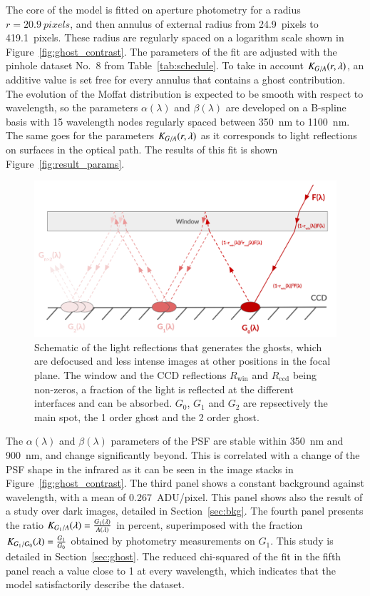 The core of the model is fitted on aperture photometry for a radius $r=\SI{20.9}{pixels}$, and then annulus of external radius from \SI{24.9}{pixels} to \SI{419.1}{pixels}. These radius are regularly spaced on a logarithm scale shown in Figure~\ref{fig:ghost_contrast}. The parameters of the fit are adjusted with the \spinhole pinhole dataset No.~8 from Table~\ref{tab:schedule}. To take in account $K_{G/A}(r, \lambda)$, an additive value is set free for every annulus that contains a ghost contribution. The evolution of the Moffat distribution is expected to be smooth with respect to wavelength, so the parameters $\alpha(\lambda)$ and $\beta(\lambda)$ are developed on a B-spline basis with 15 wavelength nodes regularly spaced between \SI{350}{\nano\meter} to \SI{1100}{\nano\meter}. The same goes for the parameters $K_{G/A}(r, \lambda)$ as it corresponds to light reflections on surfaces in the optical path. The results of this fit is shown Figure~\ref{fig:result_params}. 

\begin{figure}[h]
    \centering
    \includegraphics[width=\columnwidth]{fig/schema_ghost.pdf}
    \caption{Schematic of the light reflections that generates the ghosts, which are defocused and less intense images at other positions in the focal plane. The window and the CCD reflections $R_\mathrm{win}$ and $R_\mathrm{ccd}$ being non-zeros, a fraction of the light is reflected at the different interfaces and can be absorbed. $G_0$, $G_1$ and $G_2$ are repsectively the main spot, the 1 order ghost and the 2 order ghost.}
    \label{fig:schema_ghost}
\end{figure}

The $\alpha(\lambda)$ and $\beta(\lambda)$ parameters of the PSF are stable within \SI{350}{\nano\meter} and \SI{900}{\nano\meter}, and change significantly beyond. This is correlated with a change of the PSF shape in the infrared as it can be seen in the image stacks in Figure~\ref{fig:ghost_contrast}. The third panel shows a constant background against wavelength, with a mean of \SI{0.267}{ADU/pixel}. This panel shows also the result of a study over dark images, detailed in Section~\ref{sec:bkg}. The fourth panel presents the ratio $K_{G_1/A}(\lambda) = \frac{G_1(\lambda)}{A(\lambda)}$ in percent, superimposed with the fraction $K_{G_1/G_0}(\lambda)=\frac{G_1}{G_0}$ obtained by photometry measurements on $G_1$. This study is detailed in Section~\ref{sec:ghost}. The reduced chi-squared of the fit in the fifth panel reach a value close to 1 at every wavelength, which indicates that the model satisfactorily describe the dataset.

